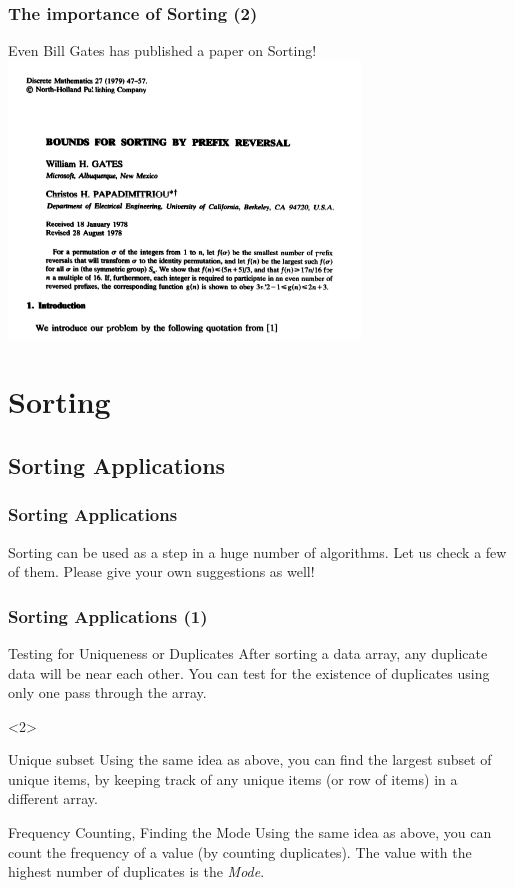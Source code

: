 \documentclass{beamer}
\begin{document}
\begin{frame}
  \frametitle{The importance of Sorting (2)}

\begin{center}
  Even Bill Gates has published a paper on Sorting!
  \medskip
  \includegraphics[width=0.7\textwidth]{img/billgates}
\end{center}
\end{frame}

\section{Sorting}
\subsection{Sorting Applications}
\begin{frame}
  \frametitle{Sorting Applications} 

  Sorting can be used as a step in a huge number of algorithms. Let us
  check a few of them. Please give your own suggestions as well!
\end{frame}


\begin{frame}
  \frametitle{Sorting Applications (1)}
  \begin{block}{Testing for Uniqueness or Duplicates}
    After sorting a data array, any duplicate data will be near each
    other. You can test for the existence of duplicates using only one pass
    through the array.
  \end{block}

  \begin{onlyenv}<2>
    \begin{block}{Unique subset}
      Using the same idea as above, you can find the largest subset of
      unique items, by keeping track of any unique items (or row of items)
      in a different array.
    \end{block}

    \begin{block}{Frequency Counting, Finding the Mode}
      Using the same idea as above, you can count the frequency of a
      value (by counting duplicates). The value with the highest
      number of duplicates is the \emph{Mode}. 
    \end{block}
  \end{onlyenv}
\end{frame}
\end{document}
